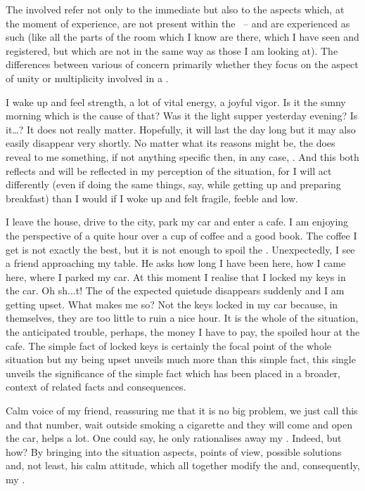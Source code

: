 \label{impressConcept}

The involved  refer not only to the immediate
 but also to the {aspects} which, at the moment of experience, are
not present within the \hoa\ -- and are experienced as such (like all the parts
of the room which I know are there, which I have seen and registered, but which
are not  in the same way as those I am  looking at). The
differences between various  of  concern primarily
whether they focus on the aspect of unity or multiplicity involved in a
.

%
I wake up and feel strength, a lot of vital energy, a joyful 
vigor. Is it the sunny morning which is the cause of that? Was it the 
light supper yesterday evening? Is it\ldots? It does not really matter. 
Hopefully, it will last the day long but it may also 
easily disappear very shortly. No matter what its reasons might be, the 
 does reveal to me something, if not anything specific then, 
in any case, . And this both reflects and will be 
reflected in my perception of the situation, for I will act 
differently (even if doing the same things, say, while getting up and preparing
breakfast) than I would if I woke up and felt fragile, feeble and low.

I leave the house, drive to the city, park my car and enter a cafe.  I am
enjoying the perspective of a quite hour over a cup of coffee and a good book.
The coffee I get is not exactly the best, but it is not enough to spoil the
.  Unexpectedly, I see a friend approaching my table. He asks how long
I have been here, how I came here, where I parked my car. At this moment I
realise that I locked my keys in the car. Oh sh...t! The  of the
expected quietude disappears suddenly and I am getting upset. What makes me so?
Not the keys locked in my car because, in themselves, they are too little to
ruin a nice hour. It is the whole  of the situation, the anticipated
trouble, perhaps, the money I have to pay, the spoiled hour at the cafe. The
simple fact of locked keys is certainly the focal point of the whole situation
but my being upset unveils much more than this simple fact, this single
 unveils the significance of the simple fact which has been
placed in a broader,  context of related facts and consequences.

Calm voice of my friend, reassuring me that it is no big problem, we just call
this and that number, wait outside smoking a cigarette and they will come and
open the car, helps a lot. One could say, he only rationalises away my
.  Indeed, but how? By bringing into the situation aspects,
points of view, possible solutions and, not least, his calm attitude, which all
together modify the  and, consequently, my .

